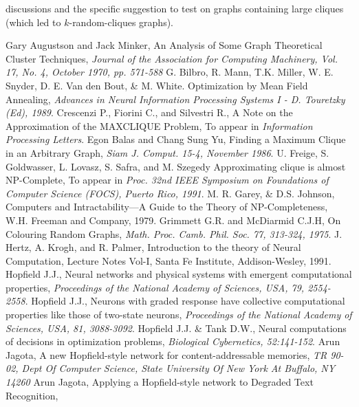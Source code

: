 discussions and the specific suggestion to test on graphs 
containing large cliques (which led to $k$-random-cliques graphs). 
\begin{thebibliography}{160}
{\small
{} Gary Augustson and Jack Minker, 
An Analysis of Some Graph Theoretical Cluster Techniques,
{\em Journal of the Association for Computing Machinery, Vol. 17, No. 4,
October 1970, pp. 571-588}
 G. Bilbro, R. Mann, T.K. Miller, W. E. Snyder,
D. E. Van den Bout, \& M. White.
Optimization by Mean Field Annealing, 
{\em Advances in Neural Information Processing Systems I - D. Touretzky (Ed), 1989}.
Crescenzi P., Fiorini C., and Silvestri R.,
A Note on the Approximation of the MAXCLIQUE Problem,
To appear in {\em Information Processing Letters}.
Egon Balas and Chang Sung Yu,
Finding a Maximum Clique in an Arbitrary Graph,
{\em Siam J. Comput. 15-4, November 1986}.
U. Freige, S. Goldwasser, L. Lovasz, S. Safra, and M. Szegedy 
Approximating clique is almost NP-Complete,
To appear in {\em Proc. 32nd IEEE Symposium on Foundations of Computer Science (FOCS), Puerto Rico, 1991}.
 M. R. Garey, \& D.S. Johnson, 
Computers and Intractability---A Guide to the Theory of NP-Completeness,
W.H. Freeman and Company, 1979.
Grimmett G.R. and McDiarmid C.J.H,
On Colouring Random Graphs,
{\em Math. Proc. Camb. Phil. Soc. 77, 313-324, 1975}.
 J. Hertz, A. Krogh, and R. Palmer, 
Introduction to the theory of Neural Computation, Lecture Notes Vol-I,
Santa Fe Institute, Addison-Wesley, 1991.
 Hopfield J.J., 
Neural networks and physical systems with emergent computational
properties,
{\em Proceedings of the National Academy of Sciences, USA, 79, 2554-2558}.
 Hopfield J.J., 
Neurons with graded response have collective computational properties like
those of two-state neurons,
{\em Proceedings of the National Academy of Sciences, USA, 81, 3088-3092}.
 Hopfield J.J. \& Tank D.W., 
Neural computations of decisions in optimization problems,
{\em Biological Cybernetics, 52:141-152}.
 Arun Jagota, 
A new Hopfield-style network for content-addressable memories, 
{\em TR 90-02, Dept Of Computer Science,
State University Of New York At Buffalo, NY 14260 }
 Arun Jagota, 
Applying a Hopfield-style network to Degraded Text Recognition,
}
\end{thebibliography}
